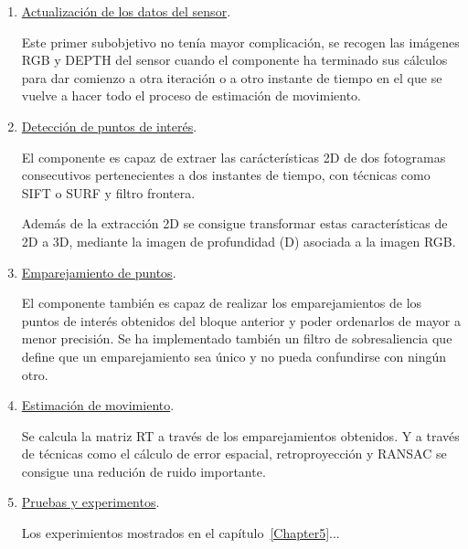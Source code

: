 \begin{enumerate}
\item \underline{Actualización de los datos del sensor}.

Este primer subobjetivo no tenía mayor complicación, se recogen las imágenes RGB y DEPTH del sensor cuando el componente ha terminado sus cálculos para dar comienzo a otra iteración o a otro instante de tiempo en el que se vuelve a hacer todo el proceso de estimación de movimiento.
 
\item \underline{Detección de puntos de interés}.

El componente es capaz de extraer las carácterísticas 2D de dos fotogramas consecutivos pertenecientes a dos instantes de tiempo, con técnicas como SIFT o SURF y filtro frontera.

Además de la extracción 2D se consigue transformar estas características de 2D a 3D, mediante la imagen de profundidad (D) asociada a la imagen RGB.

\item \underline{Emparejamiento de puntos}.

El componente también es capaz de realizar los emparejamientos de los puntos de interés obtenidos del bloque anterior y poder ordenarlos de mayor a menor precisión. Se ha implementado también un filtro de sobresaliencia que define que un emparejamiento sea único y no pueda confundirse con ningún otro.

\item \underline{Estimación de movimiento}.

Se calcula la matriz RT a través de los emparejamientos obtenidos. Y a través de técnicas como el cálculo de error espacial, retroproyección y RANSAC se consigue una redución de ruido importante.

\item \underline{Pruebas y experimentos}.

Los experimientos mostrados en el capítulo~\ref{Chapter5}...

\end{enumerate}


